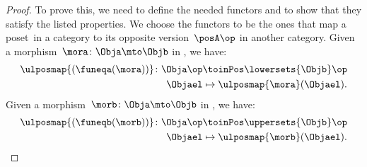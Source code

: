 \begin{proof}
    To prove this, we need to define the needed functors and to show that they satisfy the listed properties.
    We choose the functors to be the ones that map a poset~\posA in a category to its opposite version~$\posA\op$ in another category.
    Given a morphism~$\mora\colon \Obja \mto \Objb$ in \UPos, we have:
    \begin{equation}
        \begin{aligned}
            \ulposmap{(\funeqa(\mora))}\colon \Obja\op & \toinPos \lowersets{\Objb}\op \\
            \Objael                                    & \mapsto \ulposmap{\mora}(\Objael).
        \end{aligned}
    \end{equation}
    Given a morphism~$\morb\colon \Obja \mto \Objb$ in \LPos, we have:
    \begin{equation}
        \begin{aligned}
            \ulposmap{(\funeqb(\morb))}\colon \Obja\op & \toinPos \uppersets{\Objb}\op \\
            \Objael                                    & \mapsto \ulposmap{\morb}(\Objael).
        \end{aligned}
    \end{equation}


\end{proof}
